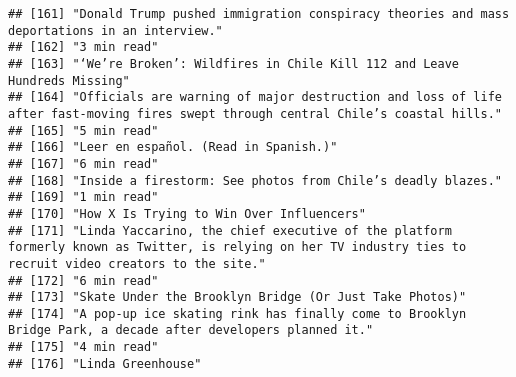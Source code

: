\documentclass[
]{article}
\begin{document}
\begin{verbatim}
## [161] "Donald Trump pushed immigration conspiracy theories and mass deportations in an interview."                                                               
## [162] "3 min read"                                                                                                                                               
## [163] "‘We’re Broken’: Wildfires in Chile Kill 112 and Leave Hundreds Missing"                                                                                   
## [164] "Officials are warning of major destruction and loss of life after fast-moving fires swept through central Chile’s coastal hills."                         
## [165] "5 min read"                                                                                                                                               
## [166] "Leer en español. (Read in Spanish.)"                                                                                                                      
## [167] "6 min read"                                                                                                                                               
## [168] "Inside a firestorm: See photos from Chile’s deadly blazes."                                                                                               
## [169] "1 min read"                                                                                                                                               
## [170] "How X Is Trying to Win Over Influencers"                                                                                                                  
## [171] "Linda Yaccarino, the chief executive of the platform formerly known as Twitter, is relying on her TV industry ties to recruit video creators to the site."
## [172] "6 min read"                                                                                                                                               
## [173] "Skate Under the Brooklyn Bridge (Or Just Take Photos)"                                                                                                    
## [174] "A pop-up ice skating rink has finally come to Brooklyn Bridge Park, a decade after developers planned it."                                                
## [175] "4 min read"                                                                                                                                               
## [176] "Linda Greenhouse"                                                                                                                                         

\end{verbatim}
\end{document}
